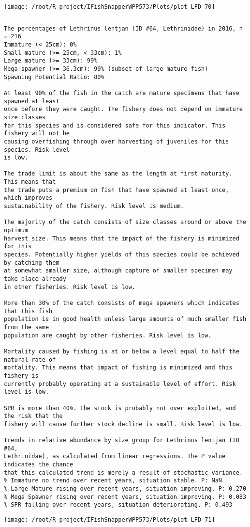 \documentclass{report}\usepackage[]{graphicx}\usepackage[]{color}
\makeatletter
\def\maxwidth{ %
  \ifdim\Gin@nat@width>\linewidth
    \linewidth
  \else
    \Gin@nat@width
  \fi
}
\newenvironment{kframe}{%
 \def\at@end@of@kframe{}%
 \ifinner\ifhmode%
  \def\at@end@of@kframe{\end{minipage}}%
  \begin{minipage}{\columnwidth}%
 \fi\fi%
 \def\FrameCommand##1{\hskip\@totalleftmargin \hskip-\fboxsep
 \colorbox{shadecolor}{##1}\hskip-\fboxsep
     \hskip-\linewidth \hskip-\@totalleftmargin \hskip\columnwidth}%
 \MakeFramed {\advance\hsize-\width
   \@totalleftmargin\z@ \linewidth\hsize
   \@setminipage}}%
 {\par\unskip\endMakeFramed%
 \at@end@of@kframe}
\newenvironment{knitrout}{}{} %
\makeatother
\begin{document}
\begin{knitrout}
\texttt{[image: /root/R-project/IFishSnapperWPP573/Plots/plot-LFD-70]} 
\begin{kframe}\begin{verbatim}
\end{verbatim}
\end{kframe}
\clearpage
\newpage
\begin{kframe}\begin{verbatim}The percentages of Lethrinus lentjan (ID #64, Lethrinidae) in 2016, n = 216
Immature (< 25cm): 0%
Small mature (>= 25cm, < 33cm): 1%
Large mature (>= 33cm): 99%
Mega spawner (>= 36.3cm): 90% (subset of large mature fish)
Spawning Potential Ratio: 80%
 
At least 90% of the fish in the catch are mature specimens that have spawned at least
once before they were caught. The fishery does not depend on immature size classes
for this species and is considered safe for this indicator. This fishery will not be
causing overfishing through over harvesting of juveniles for this species. Risk level
is low.

The trade limit is about the same as the length at first maturity.  This means that
the trade puts a premium on fish that have spawned at least once, which improves
sustainability of the fishery. Risk level is medium.

The majority of the catch consists of size classes around or above the optimum
harvest size. This means that the impact of the fishery is minimized for this
species. Potentially higher yields of this species could be achieved by catching them
at somewhat smaller size, although capture of smaller specimen may take place already
in other fisheries. Risk level is low.

More than 30% of the catch consists of mega spawners which indicates that this fish
population is in good health unless large amounts of much smaller fish from the same
population are caught by other fisheries. Risk level is low.
 
Mortality caused by fishing is at or below a level equal to half the natural rate of
mortality. This means that impact of fishing is minimized and this fishery is
currently probably operating at a sustainable level of effort. Risk level is low.
 
SPR is more than 40%. The stock is probably not over exploited, and the risk that the
fishery will cause further stock decline is small. Risk level is low.
 
Trends in relative abundance by size group for Lethrinus lentjan (ID #64,
Lethrinidae), as calculated from linear regressions. The P value indicates the chance
that this calculated trend is merely a result of stochastic variance.
% Immature no trend over recent years, situation stable. P: NaN
% Large Mature rising over recent years, situation improving. P: 0.270
% Mega Spawner rising over recent years, situation improving. P: 0.083
% SPR falling over recent years, situation deteriorating. P: 0.493
\end{verbatim}
\end{kframe}
\texttt{[image: /root/R-project/IFishSnapperWPP573/Plots/plot-LFD-71]} 


\end{knitrout}
\end{document}
